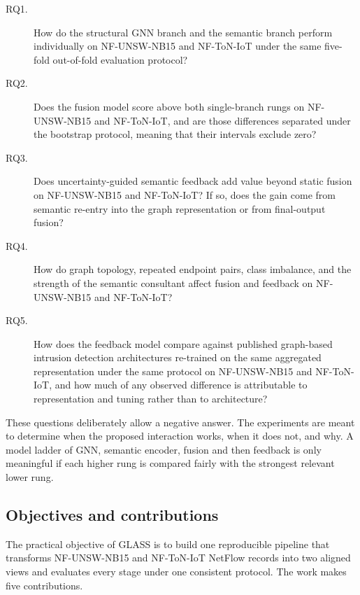 \begin{description}
    \item[RQ1.] How do the structural GNN branch and the semantic branch perform
    individually on NF-UNSW-NB15 and NF-ToN-IoT under the same five-fold out-of-fold
    evaluation protocol?

    \item[RQ2.] Does the fusion model score above both single-branch rungs on NF-UNSW-NB15 and
    NF-ToN-IoT, and are those differences separated under the bootstrap protocol, meaning that
    their intervals exclude zero?

    \item[RQ3.] Does uncertainty-guided semantic feedback add value beyond static fusion
    on NF-UNSW-NB15 and NF-ToN-IoT? If so, does the gain come from semantic re-entry into
    the graph representation or from final-output fusion?

    \item[RQ4.] How do graph topology, repeated endpoint pairs, class imbalance, and the
    strength of the semantic consultant affect fusion and feedback on NF-UNSW-NB15 and
    NF-ToN-IoT?

    \item[RQ5.] How does the feedback model compare against published graph-based
    intrusion detection architectures re-trained on the same aggregated representation
    under the same protocol on NF-UNSW-NB15 and NF-ToN-IoT, and how much of any observed
    difference is attributable to representation and tuning rather than to architecture?
\end{description}

These questions deliberately allow a negative answer. The experiments are meant to determine
when the proposed interaction works, when it does not, and why. A model ladder of GNN, semantic
encoder, fusion and then feedback is only meaningful if each higher rung is compared fairly
with the strongest relevant lower rung.

\subsection{Objectives and contributions}

The practical objective of GLASS is to build one reproducible pipeline that transforms
NF-UNSW-NB15 and NF-ToN-IoT NetFlow records into two aligned views and evaluates every
stage under one consistent protocol. The work makes five contributions.

